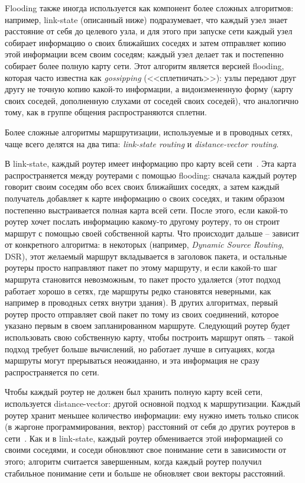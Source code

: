 \documentclass[%
]{report}
\begin{document}
Flooding также иногда используется как компонент более сложных алгоритмов:
например, link-state (описанный ниже) подразумевает,
что каждый узел знает расстояние от себя до целевого узла,
и для этого при запуске сети каждый узел собирает информацию о своих ближайших соседях
и затем отправляет копию этой информации всем своим соседям;
каждый узел делает так и постепенно собирает более полную карту сети.
Этот алгоритм является версией flooding, которая часто известна как \emph{gossipping}
(<<сплетничать>>): узлы передают друг другу не точную копию какой-то информации,
а видоизмененную форму (карту своих соседей, дополненную слухами от соседей своих соседей),
что аналогично тому, как в группе общения распространяются сплетни.


Более сложные алгоритмы маршрутизации,
используемые и в проводных сетях,
чаще всего делятся на два типа:
\emph{link-state routing} и \emph{distance-vector routing}.

В link-state, каждый роутер имеет информацию про карту всей сети~\cite{arpanet_routing}.
Эта карта распространяется между роутерами с помощью flooding:
сначала каждый роутер говорит своим соседям обо всех своих ближайших соседях,
а затем каждый получатель добавляет к карте информацию о своих соседях,
и таким образом постепенно выстраивается полная карта всей сети.
После этого, если какой-то роутер хочет послать информацию какому-то другому роутеру,
то он строит маршрут с помощью своей собственной карты.
Что происходит дальше -- зависит от конкретного алгоритма:
в некоторых (например, \emph{Dynamic Source Routing}, DSR), этот желаемый маршрут вкладывается в заголовок пакета,
и остальные роутеры просто направляют пакет по этому маршруту,
и если какой-то шаг маршрута становится невозможным, то пакет просто удаляется
(этот подход работает хорошо в сетях, где маршруты редко становятся неверными,
как например в проводных сетях внутри здания).
В других алгоритмах, первый роутер просто отправляет свой пакет
по тому из своих соединений, которое указано первым в своем запланированном маршруте.
Следующий роутер будет использовать свою собственную карту, чтобы построить маршрут опять -- 
такой подход требует больше вычислений,
но работает лучше в ситуациях, когда маршруты могут прерываться неожиданно,
и эта информация не сразу распространяется по сети.

Чтобы каждый роутер не должен был хранить полную карту всей сети,
используется distance-vector: другой основной подход к маршрутизации.
Каждый роутер хранит меньшее количество информации:
ему нужно иметь только список (в жаргоне программирования, вектор) расстояний от себя до других роутеров в сети~\cite{rfc1058}.
Как и в link-state, каждый роутер обменивается этой информацией со своими соседями,
и соседи обновляют свое понимание сети в зависимости от этого;
алгоритм считается завершенным, когда каждый роутер получил стабильное понимание сети
и больше не обновляет свои векторы расстояний.
\end{document}
